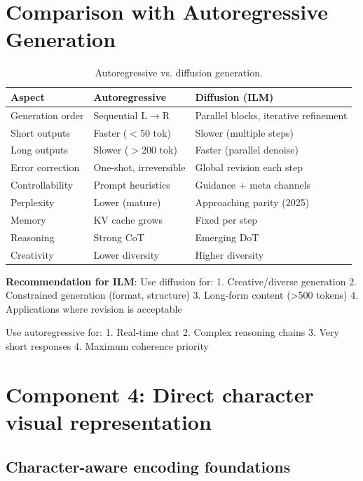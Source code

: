 \documentclass[11pt]{article}
\begin{document}
\section{Comparison with Autoregressive Generation}
\begin{table}[h]
  \centering
  \renewcommand{\arraystretch}{1.15}
  \begin{tabularx}{\linewidth}{@{} l XX @{} }
    \toprule
    Aspect & Autoregressive & Diffusion (ILM) \\
    \midrule
    Generation order & Sequential L$\to$R & Parallel blocks, iterative refinement \\
    Short outputs & Faster ($<50$ tok) & Slower (multiple steps) \\
    Long outputs & Slower ($>200$ tok) & Faster (parallel denoise) \\
    Error correction & One-shot, irreversible & Global revision each step \\
    Controllability & Prompt heuristics & Guidance + meta channels \\
    Perplexity & Lower (mature) & Approaching parity (2025) \\
    Memory & KV cache grows & Fixed per step \\
    Reasoning & Strong CoT & Emerging DoT \\
    Creativity & Lower diversity & Higher diversity \\
    \bottomrule
  \end{tabularx}
  \vspace{-6pt}
  \caption{Autoregressive vs. diffusion generation.}
\end{table}

\textbf{Recommendation for ILM}: Use diffusion for:
1. Creative/diverse generation
2. Constrained generation (format, structure)
3. Long-form content (>500 tokens)
4. Applications where revision is acceptable

Use autoregressive for:
1. Real-time chat
2. Complex reasoning chains
3. Very short responses
4. Maximum coherence priority

\section{Component 4: Direct character visual representation}

\subsection{Character-aware encoding foundations}
\end{document}
